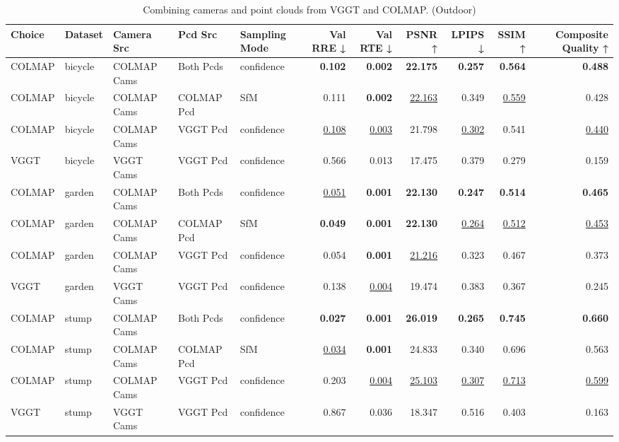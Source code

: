 \begin{table}[H]
\caption{\ifdefined\customcaption \customcaption \else Combining cameras and point clouds from VGGT and COLMAP. (Outdoor) \fi}
\label{tab:07_combined_single_brief_outdoor}
\centering
\tiny
\begin{tabular}{lllllrrrrrr}
\toprule
Choice & Dataset & Camera Src & Pcd Src & Sampling Mode & Val RRE ↓ & Val RTE ↓ & PSNR ↑ & LPIPS ↓ & SSIM ↑ & Composite Quality ↑ \\
\midrule
COLMAP & bicycle & COLMAP Cams & Both Pcds & confidence & \textbf{0.102} & \textbf{0.002} & \textbf{22.175} & \textbf{0.257} & \textbf{0.564} & \textbf{0.488} \\
COLMAP & bicycle & COLMAP Cams & COLMAP Pcd & SfM & 0.111 & \textbf{0.002} & \underline{22.163} & 0.349 & \underline{0.559} & 0.428 \\
COLMAP & bicycle & COLMAP Cams & VGGT Pcd & confidence & \underline{0.108} & \underline{0.003} & 21.798 & \underline{0.302} & 0.541 & \underline{0.440} \\
VGGT & bicycle & VGGT Cams & VGGT Pcd & confidence & 0.566 & 0.013 & 17.475 & 0.379 & 0.279 & 0.159 \\
\midrule
COLMAP & garden & COLMAP Cams & Both Pcds & confidence & \underline{0.051} & \textbf{0.001} & \textbf{22.130} & \textbf{0.247} & \textbf{0.514} & \textbf{0.465} \\
COLMAP & garden & COLMAP Cams & COLMAP Pcd & SfM & \textbf{0.049} & \textbf{0.001} & \textbf{22.130} & \underline{0.264} & \underline{0.512} & \underline{0.453} \\
COLMAP & garden & COLMAP Cams & VGGT Pcd & confidence & 0.054 & \textbf{0.001} & \underline{21.216} & 0.323 & 0.467 & 0.373 \\
VGGT & garden & VGGT Cams & VGGT Pcd & confidence & 0.138 & \underline{0.004} & 19.474 & 0.383 & 0.367 & 0.245 \\
\midrule
COLMAP & stump & COLMAP Cams & Both Pcds & confidence & \textbf{0.027} & \textbf{0.001} & \textbf{26.019} & \textbf{0.265} & \textbf{0.745} & \textbf{0.660} \\
COLMAP & stump & COLMAP Cams & COLMAP Pcd & SfM & \underline{0.034} & \textbf{0.001} & 24.833 & 0.340 & 0.696 & 0.563 \\
COLMAP & stump & COLMAP Cams & VGGT Pcd & confidence & 0.203 & \underline{0.004} & \underline{25.103} & \underline{0.307} & \underline{0.713} & \underline{0.599} \\
VGGT & stump & VGGT Cams & VGGT Pcd & confidence & 0.867 & 0.036 & 18.347 & 0.516 & 0.403 & 0.163 \\
\bottomrule
\end{tabular}
\end{table}
